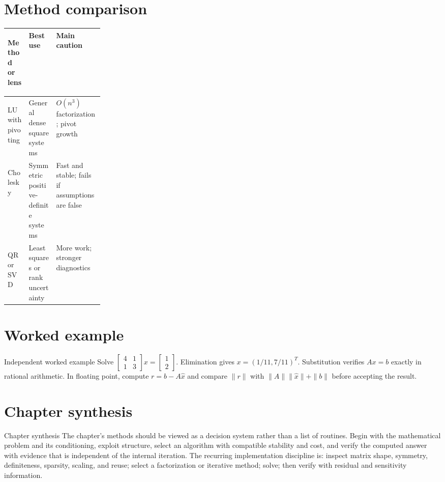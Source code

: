 \documentclass[10pt,letterpaper]{article}
\begin{document}
\section*{Method comparison}
\begin{center}
\small
\begin{tabularx}{\linewidth}{>{\bfseries\raggedright\arraybackslash}p{0.22\linewidth}XX}
\toprule
Method or lens & Best use & Main caution \\
\midrule
LU with pivoting & General dense square systems & $O(n^3)$ factorization; pivot growth \\
Cholesky & Symmetric positive-definite systems & Fast and stable; fails if assumptions are false \\
QR or SVD & Least squares or rank uncertainty & More work; stronger diagnostics \\
\bottomrule
\end{tabularx}
\end{center}

\section*{Worked example}
\begin{exambox}{Independent worked example}
Solve $\begin{bmatrix}4&1\\1&3\end{bmatrix}x=\begin{bmatrix}1\\2\end{bmatrix}$.  Elimination gives $x=(1/11,7/11)^T$.  Substitution verifies $Ax=b$ exactly in rational arithmetic.  In floating point, compute $r=b-A\widehat{x}$ and compare $\|r\|$ with $\|A\|\|\widehat{x}\|+\|b\|$ before accepting the result.
\end{exambox}

\section*{Chapter synthesis}
\begin{summarybox}{Chapter synthesis}
The chapter's methods should be viewed as a decision system rather than a list of routines.  Begin with the mathematical problem and its conditioning, exploit structure, select an algorithm with compatible stability and cost, and verify the computed answer with evidence that is independent of the internal iteration.  The recurring implementation discipline is: inspect matrix shape, symmetry, definiteness, sparsity, scaling, and reuse; select a factorization or iterative method; solve; then verify with residual and sensitivity information.
\end{summarybox}
\end{document}
